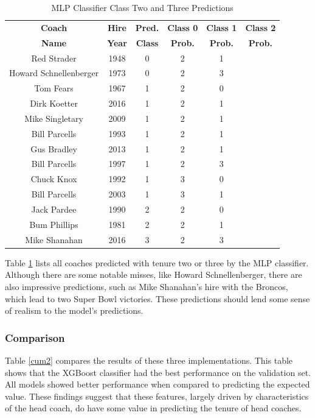 \documentclass[conference]{IEEEtran}
\begin{document}
\begin{table}[htbp]
\caption{MLP Classifier Class Two and Three Predictions}
\begin{center}
\begin{tabular}{|c||c|c|c|c|c|}
\hline
\textbf{Coach} & \textbf{Hire} & \textbf{Pred.} & \textbf{Class 0} & \textbf{Class 1} & \textbf{Class 2} \\
\textbf{Name} & \textbf{Year} & \textbf{Class} & \textbf{Prob.} & \textbf{Prob.} & \textbf{Prob.} \\
\hline
\hline
Red Strader & 1948 & 0 & 2 & 1 \\
\hline
Howard Schnellenberger & 1973 & 0 & 2 & 3 \\
\hline
Tom Fears & 1967 & 1 & 2 & 0 \\
\hline
Dirk Koetter & 2016 & 1 & 2 & 1 \\
\hline
Mike Singletary & 2009 & 1 & 2 & 1 \\
\hline
Bill Parcells & 1993 & 1 & 2 & 1 \\
\hline
Gus Bradley & 2013 & 1 & 2 & 1 \\
\hline
Bill Parcells & 1997 & 1 & 2 & 3 \\
\hline
Chuck Knox & 1992 & 1 & 3 & 0 \\
\hline
Bill Parcells & 2003 & 1 & 3 & 1 \\
\hline
Jack Pardee & 1990 & 2 & 2 & 0 \\
\hline
Bum Phillips & 1981 & 2 & 2 & 1 \\
\hline
Mike Shanahan & 2016 & 3 & 2 & 3 \\
\hline
\end{tabular}
\label{tab15}
\end{center}
\end{table}

Table \ref{tab15} lists all coaches predicted with tenure two or three by the MLP classifier. Although there are some notable misses, like Howard Schnellenberger, there are also impressive predictions, such as Mike Shanahan's hire with the Broncos, which lead to two Super Bowl victories. These predictions should lend some sense of realism to the model's predictions. 

\subsubsection{Comparison}
Table \ref{cum2} compares the results of these three implementations. This table shows that the XGBoost classifier had the best performance on the validation set. All models showed better performance when compared to predicting the expected value. These findings suggest that these features, largely driven by characteristics of the head coach, do have some value in predicting the tenure of head coaches. 
\end{document}
